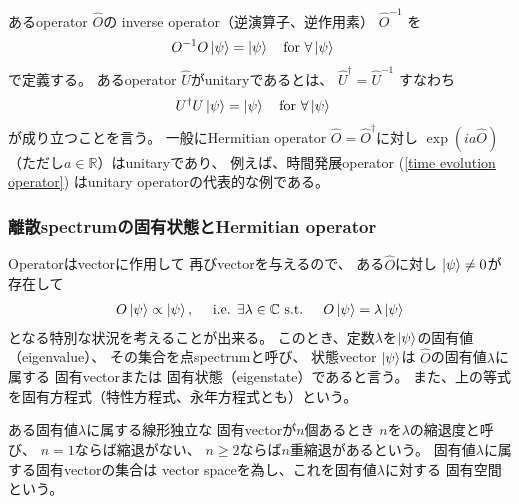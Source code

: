 あるoperator $\hat{O}$の
inverse operator（逆演算子、逆作用素）
$\hat{O}^{-1}$
を
\begin{align}
    O^{-1} O \ket{\psi} &= \ket{\psi}
    \quad\text{for $\forall \ket{\psi}$}
\end{align}
で定義する。
あるoperator $\hat{U}$がunitaryであるとは、
$ \hat{U}^\dagger = \hat{U}^{-1} $
すなわち
\begin{align}
    U^\dagger U \ket{\psi} &= \ket{\psi}
    \quad\text{for $\forall \ket{\psi}$}
\label{unitary operator}
\end{align}
が成り立つことを言う。
一般にHermitian operator $\hat{O} = \hat{O}^\dagger$に対し
$\exp( i a \hat{O})$（ただし$a \in \mathbb{R}$）はunitaryであり、
例えば、時間発展operator
(\ref{time evolution operator})
はunitary operatorの代表的な例である。

\subsubsection{離散spectrumの固有状態とHermitian operator}

Operatorはvectorに作用して
再びvectorを与えるので、
ある$\hat{O}$に対し
$\ket{\psi} \neq 0$が存在して
\begin{align}
    O\ket{\psi} \propto \ket{\psi}
,\quad\text{
    i.e.
    $\exists \lambda\in\mathbb{C}$
    s.t.
}\quad
    O\ket{\psi} = \lambda \ket{\psi}
\end{align}
となる特別な状況を考えることが出来る。
このとき、定数$\lambda$を$\ket{\psi}$の固有値（eigenvalue）、
その集合を点spectrumと呼び、
状態vector $\ket{\psi}$は
$\hat{O}$の固有値$\lambda$に属する
固有vectorまたは
固有状態（eigenstate）であると言う。
また、上の等式を固有方程式（特性方程式、永年方程式とも）という。

ある固有値$\lambda$に属する線形独立な
固有vectorが$n$個あるとき
$n$を$\lambda$の縮退度と呼び、
$n = 1$ならば縮退がない、
$n \ge 2$ならば$n$重縮退があるという。
固有値$\lambda$に属する固有vectorの集合は
vector spaceを為し、これを固有値$\lambda$に対する
固有空間という。

